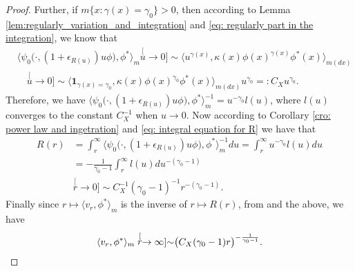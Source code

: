 \documentclass[12pt,a4paper]{amsart}
\theoremstyle{definition}
\numberwithin{equation}{section}
\begin{document}
\begin{proof}
Further, if $m\{x: \gamma(x) = \gamma_0\}> 0$, then according to Lemma \ref{lem:regularly_variation_and_integration} and \eqref{eq: regularly part in the integration}, we know that
\begin{align}
	& \big\langle \psi_0 \big(\cdot,( 1 + \epsilon_{R(u)} ) u \phi \big), \phi^* \big\rangle_m
   \stackrel[u\to 0]{}{\sim}  \langle u^{\gamma(x)} , \kappa (x)\phi(x)^{\gamma(x)} \phi^*(x)
   \rangle_{m(dx)}
	\\ & \quad \stackrel[u\to 0]{}{\sim}  \langle \mathbf 1_{\gamma(x)= \gamma_0}, \kappa (x)\phi(x)^{\gamma_0} \phi^*(x) \rangle_{m(dx)} u^{\gamma_0}
       =: C_X u^{\gamma_0}.
\end{align}
Therefore, we have $\big\langle \psi_0 \big(\cdot,( 1 + \epsilon_{R(u)} ) u \phi \big), \phi^* \big\rangle_m^{-1} = u^{-\gamma_0} l(u)$, where $l(u)$ converges to the constant $C_X^{-1}$ when $u \to 0$.
Now according to Corollary \ref{cro: power law and ingetration} and \eqref{eq: integral equation for R} we have that
\begin{align}
	R(r)
	& = \int_r^\infty \big\langle \psi_0 \big(\cdot,( 1 + \epsilon_{R(u)} ) u \phi \big), \phi^* \big\rangle_m^{-1} du
   = \int_r^\infty u^{-\gamma_0} l(u) du
	\\ & = -\frac{1}{\gamma_0-1}\int_r^\infty l(u) du^{-(\gamma_0 - 1)}
	\\ & \stackrel[r\to 0]{}{\sim} C_X^{-1} (\gamma_0-1)^{-1} r^{-(\gamma_0 - 1)}.
\end{align}
Finally since $r\mapsto \langle v_r,\phi^*\rangle_m$ is the inverse of $r\mapsto R(r)$, from \cite[Proposition 1.5.15.]{BinghamGoldieTeugels1989Regular} and the above, we have
\begin{equation}
	\langle v_r,\phi^*\rangle_m
	\stackrel[r\to \infty]{}{\sim} \big(C_X (\gamma_0-1) r \big)^{-\frac{1}{\gamma_0 - 1}}.
	\qedhere
\end{equation}
\end{proof}



\end{document}

